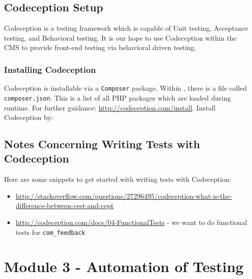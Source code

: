 \documentclass[10pt,letterpaper,titlepage]{article}
\begin{document}
\subsection{Codeception Setup}
Codeception is a testing framework which is capable of Unit testing, Acceptance testing, and Behavioral testing. It is our hope to use Codeception within the CMS to provide front-end testing via behavioral driven testing.

\subsubsection{Installing Codeception}
Codeception is installable via a \texttt{Composer} package. Within , there is a file called \texttt{composer.json}. This is a list of all PHP packages which are loaded during runtime.
For further guidance: \url{http://codeception.com/install}.
Install Codeception by:

\subsection{Notes Concerning Writing Tests with Codeception}
Here are some snippets to get started with writing tests with Codeception:

\begin{itemize}
\item \url{http://stackoverflow.com/questions/27296495/codeception-what-is-the-difference-between-cest-and-cept}
\item \url{http://codeception.com/docs/04-FunctionalTests} - we want to do functional tests for \texttt{com\_feedback}
\end{itemize}

\section{Module 3 - Automation of Testing}
\end{document}
